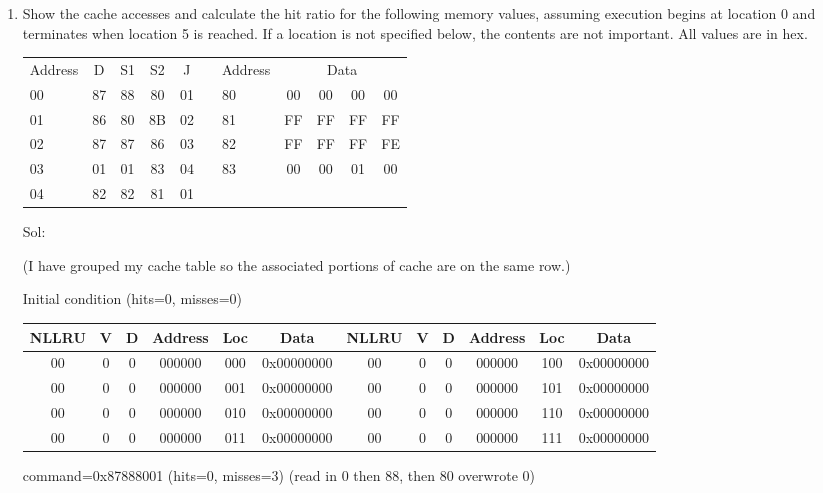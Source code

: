 \begin{enumerate}
{    The entire cache has $8\times 42 = 336$ bits

    }

    \item Show the cache accesses and calculate the hit ratio for the following memory values, assuming execution begins at location 0 and terminates when location 5 is reached.  If a location is not specified below, the contents are not important.  All values are in hex.

\begin{tabular}{l|c|c|c|c|cl|c|c|c|c|}
Address & D  & S1 & S2 & J  && Address & \multicolumn{4}{c|}{Data} \\ \cline{1-5} \cline{7-11}
00      & 87 & 88 & 80 & 01 && 80    & 00 & 00 & 00 & 00 \\
01      & 86 & 80 & 8B & 02 && 81    & FF & FF & FF & FF \\
02      & 87 & 87 & 86 & 03 && 82    & FF & FF & FF & FE \\
03      & 01 & 01 & 83 & 04 && 83    & 00 & 00 & 01 & 00 \\
04      & 82 & 82 & 81 & 01 &&       &    &    &    &    \\
\end{tabular}

    {\color{ans}
    Sol:

    (I have grouped my cache table so the associated portions of cache are on the same row.)

    Initial condition (hits=0, misses=0)

    \begin{tabular}{|c|c|c|c|c|c||c|c|c|c|c|c|} \hline
    NLLRU & V & D & Address & Loc & Data       & NLLRU & V & D & Address & Loc & Data        \\ \hline
    00    & 0 & 0 & 000000  & 000 & 0x00000000 & 00    & 0 & 0 & 000000  & 100 & 0x00000000  \\ \hline
    00    & 0 & 0 & 000000  & 001 & 0x00000000 & 00    & 0 & 0 & 000000  & 101 & 0x00000000  \\ \hline
    00    & 0 & 0 & 000000  & 010 & 0x00000000 & 00    & 0 & 0 & 000000  & 110 & 0x00000000  \\ \hline
    00    & 0 & 0 & 000000  & 011 & 0x00000000 & 00    & 0 & 0 & 000000  & 111 & 0x00000000  \\ \hline
    \end{tabular}


    command=0x87888001 (hits=0, misses=3) (read in 0 then 88, then 80 overwrote 0)

}
\end{enumerate}
